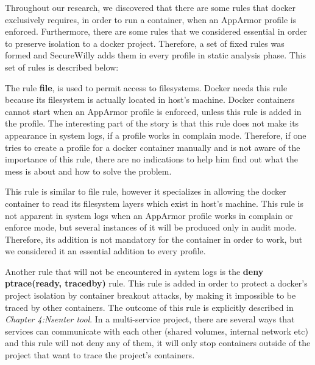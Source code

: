 Throughout our research, we discovered that there are some rules that docker exclusively requires, in order to run a container, when an AppArmor profile is enforced. Furthermore, there are some rules that we considered essential in order to preserve isolation to a docker project. Therefore, a set of fixed rules was formed and SecureWilly adds them in every profile in static analysis phase. This set of rules is described below:

\begin{description}[style=nextline]
\item[file rule]
The rule \textbf{file}, is used to permit access to filesystems. Docker needs this rule because its filesystem is actually located in host's machine. Docker containers cannot start when an AppArmor profile is enforced, unless this rule is added in the profile. The interesting part of the story is that this rule does not make its appearance in system logs, if a profile works in complain mode. Therefore, if one tries to create a profile for a docker container manually and is not aware of the importance of this rule, there are no indications to help him find out what the mess is about and how to solve the problem.

\item[/var/lib/docker/* r]
This rule is similar to file rule, however it specializes in allowing the docker container to read its filesystem layers which exist in host's machine. This rule is not apparent in system logs when an AppArmor profile works in complain or enforce mode, but several instances of it will be produced only in audit mode. Therefore, its addition is not mandatory for the container in order to work, but we considered it an essential addition to every profile.

\item[deny ptrace(ready, tracedby)]
Another rule that will not be encountered in system logs is the \textbf{deny ptrace(ready, tracedby)} rule. This rule is added in order to protect a docker's project isolation by container breakout attacks, by making it impossible to be traced by other containers. The outcome of this rule is explicitly described in \textit{Chapter 4:Nsenter tool}. In a multi-service project, there are several ways that services can communicate with each other (shared volumes, internal network etc) and this rule will not deny any of them, it will only stop containers outside of the project that want to trace the project's containers.
\end{description}


